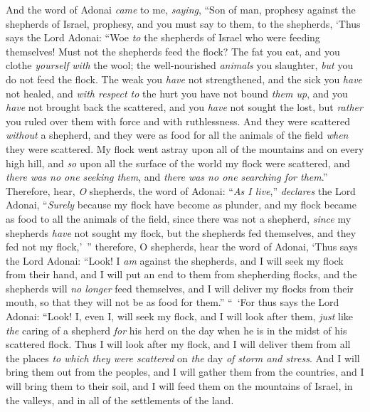 \begin{biblechapter} %
 And the word of Adonai \textit{came} to me, \textit{saying},
\verse “Son of man, prophesy against the shepherds of Israel, prophesy, and you must say to them, to the shepherds, ‘Thus says the Lord Adonai: “Woe \textit{to} the shepherds of Israel who were feeding themselves! Must not the shepherds feed the flock?
\verse The fat you eat, and you clothe \textit{yourself} \textit{with} the wool; the well-nourished \textit{animals} you slaughter, \textit{but} you do not feed the flock.
\verse The weak you \textit{have} not strengthened, and the sick you \textit{have} not healed, and \textit{with respect to} the hurt you have not bound \textit{them up}, and you \textit{have} not brought back the scattered, and you \textit{have} not sought the lost, but \textit{rather} you ruled over them with force and with ruthlessness.
\verse And they were scattered \textit{without} a shepherd, and they were as food for all the animals of the field \textit{when} they were scattered.
\verse My flock went astray upon all of the mountains and on every high hill, and \textit{so} upon all the surface of the world my flock were scattered, and \textit{there was no one seeking them}, and \textit{there was no one searching for them}.”
\verse Therefore, hear, \textit{O} shepherds, the word of Adonai:
\verse “\textit{As I live},” \textit{declares} the Lord Adonai, “\textit{Surely} because my flock have become as plunder, and my flock became as food to all the animals of the field, since there was not a shepherd, \textit{since} my shepherds \textit{have} not sought my flock, but the shepherds fed themselves, and they fed not my flock,’ ”
\verse therefore, O shepherds, hear the word of Adonai,
\verse ‘Thus says the Lord Adonai: “Look! I \textit{am} against the shepherds, and I will seek my flock from their hand, and I will put an end to them from shepherding flocks, and the shepherds will \textit{no longer} feed themselves, and I will deliver my flocks from their mouth, so that they will not be as food for them.”
\verse “ ‘For thus says the Lord Adonai: “Look! I, even I, will seek my flock, and I will look after them,
\verse \textit{just} like \textit{the} caring of a shepherd \textit{for} his herd on the day when he is in the midst of his scattered flock. Thus I will look after my flock, and I will deliver them from all the places \textit{to which they were scattered} on \textit{the} day \textit{of storm and stress}.
\verse And I will bring them out from the peoples, and I will gather them from the countries, and I will bring them to their soil, and I will feed them on the mountains of Israel, in the valleys, and in all of the settlements of the land.

\end{biblechapter}
